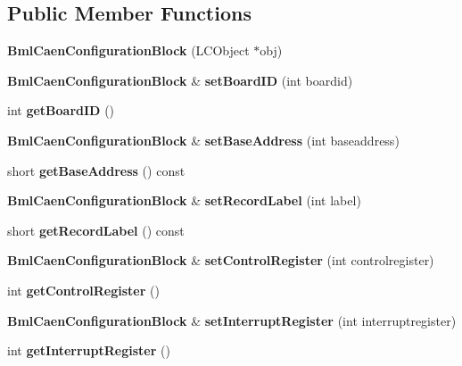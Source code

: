 \subsection*{Public Member Functions}
\begin{DoxyCompactItemize}
\item 
{\bfseries BmlCaenConfigurationBlock} (LCObject $\ast$obj)\label{classCALICE_1_1BmlCaenConfigurationBlock_a15ef15c6db9d50ae58e65f2c98ed73bd}

\item 
{\bf BmlCaenConfigurationBlock} \& {\bfseries setBoardID} (int boardid)\label{classCALICE_1_1BmlCaenConfigurationBlock_a59fe78bec24532de95313aef863c9ff2}

\item 
int {\bfseries getBoardID} ()\label{classCALICE_1_1BmlCaenConfigurationBlock_a360a11a0204d58df71637193c4b9ead1}

\item 
{\bf BmlCaenConfigurationBlock} \& {\bfseries setBaseAddress} (int baseaddress)\label{classCALICE_1_1BmlCaenConfigurationBlock_a079fc5fd9026b0ef6c05fe33317290e9}

\item 
short {\bfseries getBaseAddress} () const \label{classCALICE_1_1BmlCaenConfigurationBlock_a8e7b031737715e85f55e8b4125d0b76b}

\item 
{\bf BmlCaenConfigurationBlock} \& {\bfseries setRecordLabel} (int label)\label{classCALICE_1_1BmlCaenConfigurationBlock_ac272a9c66fd223224a2a200cb7d2a66b}

\item 
short {\bfseries getRecordLabel} () const \label{classCALICE_1_1BmlCaenConfigurationBlock_aa8b83429f623d10f65edabe8a8b5a4a1}

\item 
{\bf BmlCaenConfigurationBlock} \& {\bfseries setControlRegister} (int controlregister)\label{classCALICE_1_1BmlCaenConfigurationBlock_adf3f1a86fc1b8e1088669ae247dc96a6}

\item 
int {\bfseries getControlRegister} ()\label{classCALICE_1_1BmlCaenConfigurationBlock_acbcca488fd13727aa889f6ad53c8f4dc}

\item 
{\bf BmlCaenConfigurationBlock} \& {\bfseries setInterruptRegister} (int interruptregister)\label{classCALICE_1_1BmlCaenConfigurationBlock_aebab0b05f74576366201b44bee1752a6}

\item 
int {\bfseries getInterruptRegister} ()\label{classCALICE_1_1BmlCaenConfigurationBlock_af4ee7799dca9ad03e3d214b1d736fa13}


\end{DoxyCompactItemize}
